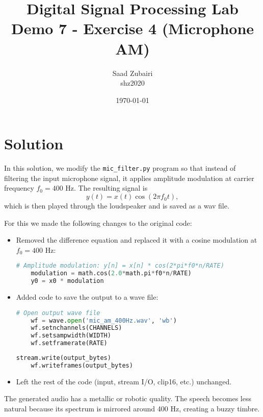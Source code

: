 \documentclass[11pt]{article}
\title{
    \vspace{3em}
    \textbf{Digital Signal Processing Lab}\\
    Demo 7 - Exercise 4 (Microphone AM)
    \vspace{1em}
}
\author{
    Saad Zubairi \\ 
    shz2020 \\
    \vspace{1em}
}
\date{\today}
\begin{document}
\maketitle	

\pagebreak



\section*{Solution}

In this solution, we modify the \texttt{mic\_filter.py} program so that instead of filtering the input microphone signal, it applies amplitude modulation at carrier frequency $f_0 = 400$ Hz. The resulting signal is
\[
y(t) = x(t)\cos(2\pi f_0 t),
\]
which is then played through the loudspeaker and is saved as a wav file.

For this we made the following changes to the original code:

\begin{itemize}
    \item Removed the difference equation and replaced it with a cosine modulation at $f_0=400$ Hz:
    \begin{lstlisting}[language=python, caption={AM modulation}]
    # Amplitude modulation: y[n] = x[n] * cos(2*pi*f0*n/RATE)
    modulation = math.cos(2.0*math.pi*f0*n/RATE)
    y0 = x0 * modulation
    \end{lstlisting}
    \item Added code to save the output to a wave file:
    \begin{lstlisting}[language=python, caption={Opening/writing output wav file stream}]
    # Open output wave file
    wf = wave.open('mic_am_400Hz.wav', 'wb')
    wf.setnchannels(CHANNELS)
    wf.setsampwidth(WIDTH)
    wf.setframerate(RATE)
    \end{lstlisting}
    \begin{lstlisting}[language=python, caption={Writing bytes in the wav file}]
    stream.write(output_bytes)
    wf.writeframes(output_bytes)
    \end{lstlisting}
    \item Left the rest of the code (input, stream I/O, clip16, etc.) unchanged.
\end{itemize}

The generated audio has a metallic or robotic quality. The speech becomes less natural because its spectrum is mirrored around 400 Hz, creating a buzzy timbre.
\end{document}
